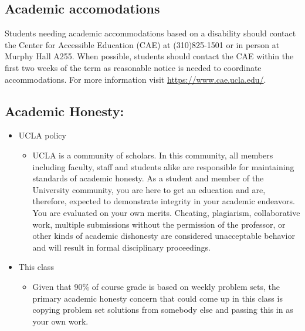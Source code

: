 \documentclass[11pt,]{article}
\providecommand{\tightlist}{%
  \setlength{\itemsep}{0pt}\setlength{\parskip}{0pt}}
\begin{document}
\hypertarget{academic-accomodations}{%
\subsection{Academic accomodations}\label{academic-accomodations}}

Students needing academic accommodations based on a disability should
contact the Center for Accessible Education (CAE) at (310)825-1501 or in
person at Murphy Hall A255. When possible, students should contact the
CAE within the first two weeks of the term as reasonable notice is
needed to coordinate accommodations. For more information visit
\url{https://www.cae.ucla.edu/}.

\hypertarget{academic-honesty}{%
\subsection{Academic Honesty:}\label{academic-honesty}}

\begin{itemize}
\tightlist
\item
  UCLA policy

  \begin{itemize}
  \tightlist
  \item
    UCLA is a community of scholars. In this community, all members
    including faculty, staff and students alike are responsible for
    maintaining standards of academic honesty. As a student and member
    of the University community, you are here to get an education and
    are, therefore, expected to demonstrate integrity in your academic
    endeavors. You are evaluated on your own merits. Cheating,
    plagiarism, collaborative work, multiple submissions without the
    permission of the professor, or other kinds of academic dishonesty
    are considered unacceptable behavior and will result in formal
    disciplinary proceedings.
  \end{itemize}
\item
  This class

  \begin{itemize}
  \tightlist
  \item
    Given that 90\% of course grade is based on weekly problem sets, the
    primary academic honesty concern that could come up in this class is
    copying problem set solutions from somebody else and passing this in
    as your own work.
  \end{itemize}
\end{itemize}
\end{document}
